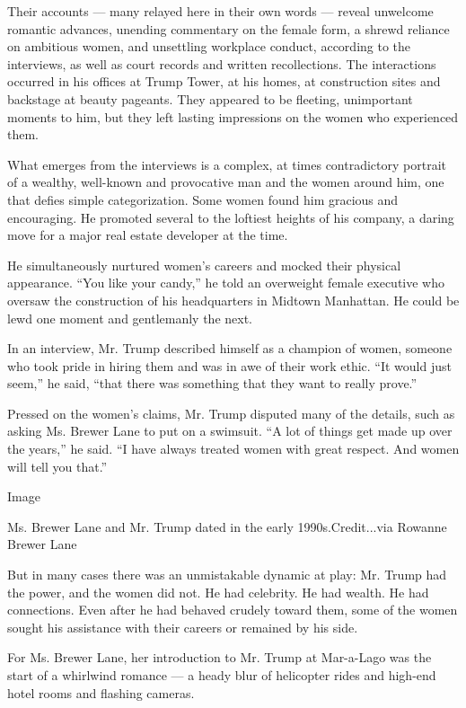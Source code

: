Their accounts --- many relayed here in their own words --- reveal
unwelcome romantic advances, unending commentary on the female form, a
shrewd reliance on ambitious women, and unsettling workplace conduct,
according to the interviews, as well as court records and written
recollections. The interactions occurred in his offices at Trump Tower,
at his homes, at construction sites and backstage at beauty pageants.
They appeared to be fleeting, unimportant moments to him, but they left
lasting impressions on the women who experienced them.

What emerges from the interviews is a complex, at times contradictory
portrait of a wealthy, well-known and provocative man and the women
around him, one that defies simple categorization. Some women found him
gracious and encouraging. He promoted several to the loftiest heights of
his company, a daring move for a major real estate developer at the
time.

He simultaneously nurtured women's careers and mocked their physical
appearance. ``You like your candy,'' he told an overweight female
executive who oversaw the construction of his headquarters in Midtown
Manhattan. He could be lewd one moment and gentlemanly the next.

In an interview, Mr. Trump described himself as a champion of women,
someone who took pride in hiring them and was in awe of their work
ethic. ``It would just seem,'' he said, ``that there was something that
they want to really prove.''

Pressed on the women's claims, Mr. Trump disputed many of the details,
such as asking Ms. Brewer Lane to put on a swimsuit. ``A lot of things
get made up over the years,'' he said. ``I have always treated women
with great respect. And women will tell you that.''

Image

Ms. Brewer Lane and Mr. Trump dated in the early 1990s.Credit...via
Rowanne Brewer Lane

But in many cases there was an unmistakable dynamic at play: Mr. Trump
had the power, and the women did not. He had celebrity. He had wealth.
He had connections. Even after he had behaved crudely toward them, some
of the women sought his assistance with their careers or remained by his
side.

For Ms. Brewer Lane, her introduction to Mr. Trump at Mar-a-Lago was the
start of a whirlwind romance --- a heady blur of helicopter rides and
high-end hotel rooms and flashing cameras.

